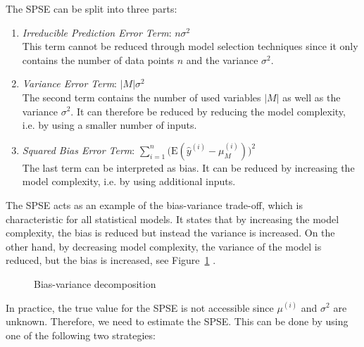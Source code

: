 \documentclass[10pt,a4paper]{report}
\begin{document}
The SPSE can be split into three parts:

\begin{enumerate}
	\item \emph{Irreducible Prediction Error Term}: $n\sigma^2$ \\
	This term cannot be reduced through model selection techniques since it only contains the number of data points $n$ and the variance $\sigma^2$.

	\item \emph{Variance Error Term}: $\vert M \vert \sigma^2$ \\
	The second term contains the number of used variables $\vert M \vert$ as well as the variance $\sigma^2$. It can therefore be reduced by reducing the model complexity, i.e. by using a smaller number of inputs.
	
	\item \emph{Squared Bias Error Term}: $\sum_{i=1}^{n} \big( \text{E}(\hat y^{(i)} - \mu^{(i)}_M) \big)^2$\\
	The last term can be interpreted as bias. It can be reduced by increasing the model complexity, i.e. by using additional inputs.
\end{enumerate}
%
The SPSE acts as an example of the bias-variance trade-off, which is characteristic for all statistical models. It states that by increasing the model complexity, the bias is reduced but instead the variance is increased. On the other hand, by decreasing model complexity, the variance of the model is reduced, but the bias is increased, see Figure~\ref{fig:bv-decomposition} \cite{bishop2006patternRecognition}.

\begin{figure}[H]
	\centering
	\caption{Bias-variance decomposition}
	\label{fig:bv-decomposition}
\end{figure}
%
In practice, the true value for the SPSE is not accessible since $\mu^{(i)}$ and $\sigma^2$ are unknown. Therefore, we need to estimate the SPSE. This can be done by using one of the following two strategies:
\end{document}
